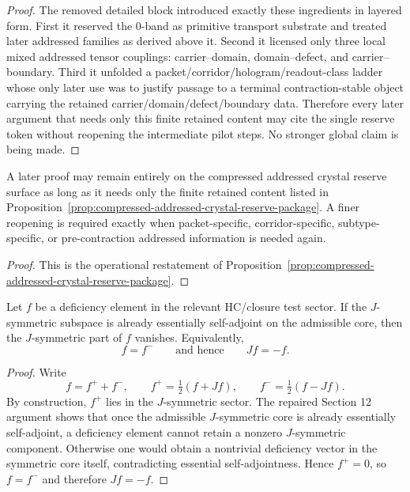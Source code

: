 \begin{proof}
The removed detailed block introduced exactly these ingredients in layered form. First it reserved the 0-band as primitive transport substrate and treated later addressed families as derived above it. Second it licensed only three local mixed addressed tensor couplings: carrier--domain, domain--defect, and carrier--boundary. Third it unfolded a packet/corridor/hologram/readout-class ladder whose only later use was to justify passage to a terminal contraction-stable object carrying the retained carrier/domain/defect/boundary data. Therefore every later argument that needs only this finite retained content may cite the single reserve token without reopening the intermediate pilot steps. No stronger global claim is being made.
\end{proof}

\begin{corollary}
\label{cor:use-rule-for-the-compressed-addressed-crystal-reserve-surface}
A later proof may remain entirely on the compressed addressed crystal reserve surface as long as it needs only the finite retained content listed in Proposition~\ref{prop:compressed-addressed-crystal-reserve-package}. A finer reopening is required exactly when packet-specific, corridor-specific, subtype-specific, or pre-contraction addressed information is needed again.
\end{corollary}

\begin{proof}
This is the operational restatement of Proposition~\ref{prop:compressed-addressed-crystal-reserve-package}.
\end{proof}

\begin{lemma}
\label{lem:closed-deficiency-antisymmetry}
Let $f$ be a deficiency element in the relevant HC/closure test sector. If the
$J$-symmetric subspace is already essentially self-adjoint on the admissible
core, then the $J$-symmetric part of $f$ vanishes. Equivalently,
\[
  f=f^-\qquad\text{and hence}\qquad Jf=-f.
\]
\end{lemma}

\begin{proof}
Write
\[
  f=f^+ + f^-,\qquad f^+=\tfrac12(f+Jf),\qquad f^- = \tfrac12(f-Jf).
\]
By construction, $f^+$ lies in the $J$-symmetric sector. The repaired Section 12
argument shows that once the admissible $J$-symmetric core is already
essentially self-adjoint, a deficiency element cannot retain a nonzero
$J$-symmetric component. Otherwise one would obtain a nontrivial deficiency
vector in the symmetric core itself, contradicting essential self-adjointness.
Hence $f^+=0$, so $f=f^-$ and therefore $Jf=-f$.
\end{proof}

